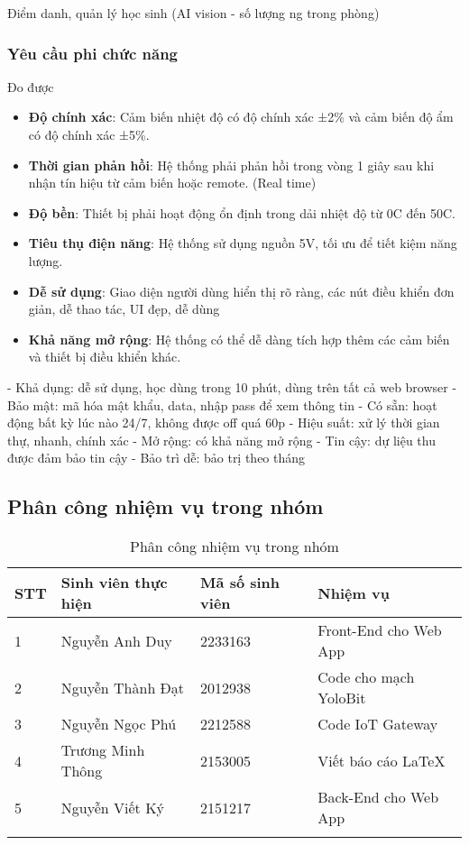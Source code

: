 Điểm danh, quản lý học sinh (AI vision - số lượng ng trong phòng)

\subsubsection{Yêu cầu phi chức năng}
Đo được
\begin{itemize}
    \item \textbf{Độ chính xác}: Cảm biến nhiệt độ có độ chính xác ±2\% và cảm biến độ ẩm có độ chính xác ±5\%.
    \item \textbf{Thời gian phản hồi}: Hệ thống phải phản hồi trong vòng 1 giây sau khi nhận tín hiệu từ cảm biến hoặc remote. (Real time)
    \item \textbf{Độ bền}: Thiết bị phải hoạt động ổn định trong dải nhiệt độ từ 0\degree C đến 50\degree C.
    \item \textbf{Tiêu thụ điện năng}: Hệ thống sử dụng nguồn 5V, tối ưu để tiết kiệm năng lượng.
    \item \textbf{Dễ sử dụng}: Giao diện người dùng hiển thị rõ ràng, các nút điều khiển đơn giản, dễ thao tác, UI đẹp, dễ dùng
    \item \textbf{Khả năng mở rộng}: Hệ thống có thể dễ dàng tích hợp thêm các cảm biến và thiết bị điều khiển khác.
\end{itemize}
- Khả dụng: dễ sử dụng, học dùng trong 10 phút, dùng trên tất cả web browser
- Bảo mật: mã hóa mật khẩu, data, nhập pass để xem thông tin
- Có sẵn: hoạt động bất kỳ lúc nào 24/7, không được off quá 60p
- Hiệu suất: xử lý thời gian thự, nhanh, chính xác
- Mở rộng: có khả năng mở rộng
- Tin cậy: dự liệu thu được đảm bảo tin cậy
- Bảo trì dễ: bảo trị theo tháng

\subsection{Phân công nhiệm vụ trong nhóm}


\begin{longtable}{|p{}|p{}|p{}|p{}|}
    \hline
    \textbf{STT} & \textbf{Sinh viên thực hiện} & \textbf{Mã số sinh viên} & \textbf{Nhiệm vụ}     \\
    \hline
    1            & Nguyễn Anh Duy               & 2233163                  & Front-End cho Web App \\
    \hline
    2            & Nguyễn Thành Đạt             & 2012938                  & Code cho mạch YoloBit \\
    \hline
    3            & Nguyễn Ngọc Phú              & 2212588                  & Code IoT Gateway      \\
    \hline
    4            & Trương Minh Thông            & 2153005                  & Viết báo cáo \LaTeX   \\
    \hline
    5            & Nguyễn Viết Ký               & 2151217                  & Back-End cho Web App  \\
    \hline
    \caption{Phân công nhiệm vụ trong nhóm}
    \label{tab:phancong}
\end{longtable}